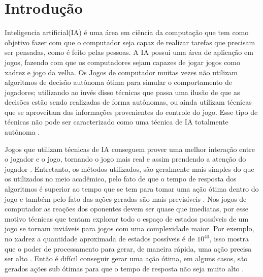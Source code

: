 \chapter{\label{chap:intro}Introdução}

Inteligencia artificial(IA) é uma área em ciência da computação que tem como objetivo fazer com que o computador seja capaz de realizar tarefas que precisam ser pensadas, como é feito pelas pessoas. A IA possui uma área de aplicação em jogos, fazendo com que os computadores sejam capazes de jogar jogos como xadrez e jogo da velha. 
Os Jogos de computador muitas vezes não utilizam algoritmos de decisão autônoma ótima para simular o comportamento de jogadores; utilizando ao invés disso técnicas que passa uma ilusão de que as decisões estão sendo realizadas de forma autônomas, ou ainda utilizam técnicas que se aproveitam das informações provenientes do controle do jogo. Esse tipo de técnicas não pode ser caracterizado como uma técnica de IA totalmente autônoma \cite{millington2009artificial}.  

Jogos que utilizam técnicas de IA conseguem prover uma melhor interação entre o jogador e o jogo, tornando o jogo mais real e assim prendendo a atenção do jogador \cite{millington2009artificial}. 
Entretanto, os métodos utilizados, são geralmente mais simples do que os utilizados no meio acadêmico, pelo fato de que o tempo de resposta dos algoritmos é superior ao tempo que se tem para tomar uma ação ótima dentro do jogo e também pelo fato das ações geradas são mais previsíveis \cite{intelligence2003modern}.
Nos jogos de computador as reações dos oponentes devem ser quase que imediatas, por esse motivo técnicas que tentam explorar todo o espaço de estados possíveis de um jogo se tornam inviáveis para jogos com uma complexidade maior.
Por exemplo, no xadrez a quantidade aproximada de estados possíveis é de $10^{40}$, isso mostra que o poder de processamento para gerar, de maneira rápida, uma ação precisa ser alto \cite{millington2009artificial}. 
Então é difícil conseguir gerar uma ação ótima, em alguns casos, são gerados ações sub ótimas para que o tempo de resposta não seja muito alto \cite{intelligence2003modern}. 

